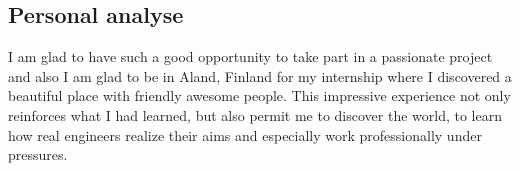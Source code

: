 \subsection{Personal analyse}
I am glad to have such a good opportunity to take part in a passionate project and also I am glad to be in Aland, Finland for my internship where I discovered a beautiful place with friendly awesome people. This impressive experience not only reinforces what I had learned, but also permit me to discover the world, to learn how real engineers realize their aims and especially work professionally under pressures.